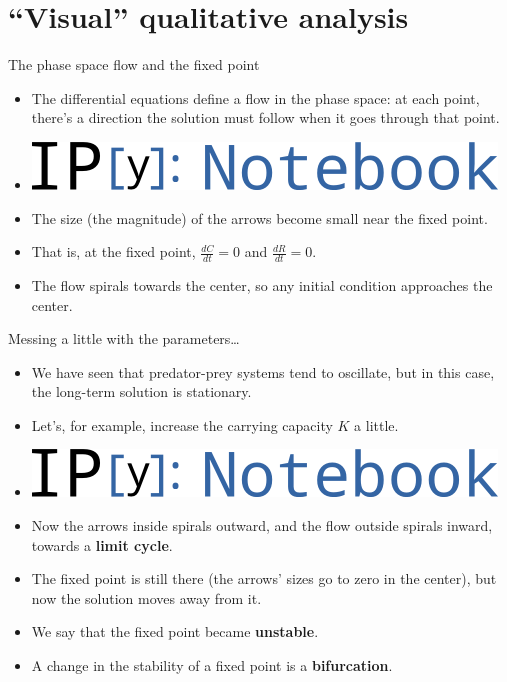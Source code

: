 \documentclass{beamer}
\begin{document}
\section{``Visual'' qualitative analysis}

\begin{frame}{The phase space flow and the fixed point}
    \begin{itemize}
        \item The differential equations define a flow in the phase space: at
            each point, there's a direction the solution must follow when it
            goes through that point.
        \item
            \includegraphics[height=1.5ex]{ipynblogo.png}
            \pause
        \item The size (the magnitude) of the arrows become small near
            the fixed point.
        \item That is, at the fixed point, $\frac{dC}{dt} = 0$ and
            $\frac{dR}{dt} = 0$.
        \item The flow spirals towards the center, so any initial condition
            approaches the center.
    \end{itemize}
\end{frame}

\begin{frame}{Messing a little with the parameters\ldots}
    \begin{itemize}
        \item We have seen that predator-prey systems tend to oscillate, but in this
            case, the long-term solution is stationary.
        \item Let's, for example, increase the carrying capacity $K$ a little.
        \item
            \includegraphics[height=1.5ex]{ipynblogo.png}
            \pause
        \item Now the arrows inside spirals outward, and the flow outside
            spirals inward, towards a \textbf{limit cycle}.
        \item The fixed point is still there (the arrows' sizes go to zero
            in the center), but now the solution moves away from it.
        \item We say that the fixed point became \textbf{unstable}.
        \item A change in the stability of a fixed point is a
            \textbf{bifurcation}.
    \end{itemize}
\end{frame}
\end{document}
